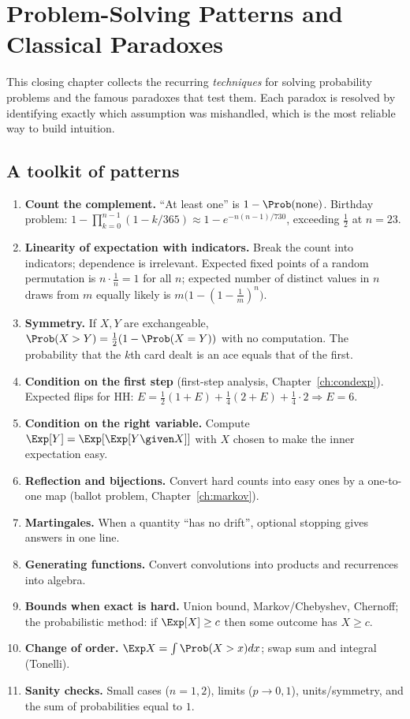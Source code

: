 \chapter{Problem-Solving Patterns and Classical Paradoxes}
\label{ch:patterns}

This closing chapter collects the recurring \emph{techniques} for solving probability problems and
the famous paradoxes that test them. Each paradox is resolved by identifying exactly which assumption
was mishandled, which is the most reliable way to build intuition.

\section{A toolkit of patterns}

\begin{enumerate}
\item \textbf{Count the complement.} ``At least one'' is $1-\Prob(\text{none})$. Birthday problem:
$1-\prod_{k=0}^{n-1}(1-k/365)\approx1-e^{-n(n-1)/730}$, exceeding $\tfrac12$ at $n=23$.
\item \textbf{Linearity of expectation with indicators.} Break the count into indicators; dependence is
irrelevant. Expected fixed points of a random permutation is $n\cdot\frac1n=1$ for all $n$; expected
number of distinct values in $n$ draws from $m$ equally likely is $m\bigl(1-(1-\tfrac1m)^n\bigr)$.
\item \textbf{Symmetry.} If $X,Y$ are exchangeable, $\Prob(X>Y)=\tfrac12(1-\Prob(X=Y))$ with no computation.
The probability that the $k$th card dealt is an ace equals that of the first.
\item \textbf{Condition on the first step} (first-step analysis, Chapter~\ref{ch:condexp}). Expected flips for
HH: $E=\tfrac12(1+E)+\tfrac14(2+E)+\tfrac14\cdot2\Rightarrow E=6$.
\item \textbf{Condition on the right variable.} Compute $\Exp[Y]=\Exp[\Exp[Y\given X]]$ with $X$ chosen to make
the inner expectation easy.
\item \textbf{Reflection and bijections.} Convert hard counts into easy ones by a one-to-one
map (ballot problem, Chapter~\ref{ch:markov}).
\item \textbf{Martingales.} When a quantity ``has no drift'', optional stopping gives answers in one line.
\item \textbf{Generating functions.} Convert convolutions into products and recurrences into algebra.
\item \textbf{Bounds when exact is hard.} Union bound, Markov/Chebyshev, Chernoff; the probabilistic method:
if $\Exp[X]\ge c$ then some outcome has $X\ge c$.
\item \textbf{Change of order.} $\Exp X=\int\Prob(X>x)dx$; swap sum and integral (Tonelli).
\item \textbf{Sanity checks.} Small cases ($n=1,2$), limits ($p\to0,1$), units/symmetry, and the sum of
probabilities equal to $1$.
\end{enumerate}


